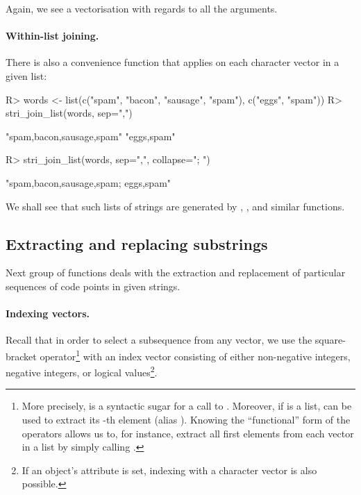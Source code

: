 \documentclass[nojss]{jss}\usepackage[]{graphicx}\usepackage[]{color}
\begin{document}
\noindent
Again, we see a vectorisation with regards to all the arguments.



\paragraph{Within-list joining.}
There is also a convenience function that applies 
on each character vector in a given list:

\begin{Schunk}
\begin{Sinput}
R> words <- list(c("spam", "bacon", "sausage", "spam"), c("eggs", "spam"))
R> stri_join_list(words, sep=",")
\end{Sinput}
\begin{Soutput}
[1] "spam,bacon,sausage,spam" "eggs,spam"
\end{Soutput}
\begin{Sinput}
R> stri_join_list(words, sep=",", collapse="; ")
\end{Sinput}
\begin{Soutput}
[1] "spam,bacon,sausage,spam; eggs,spam"
\end{Soutput}
\end{Schunk}

\noindent
We shall see that such lists of strings
are generated by , ,
and similar functions.





\subsection{Extracting and replacing substrings}

Next group of functions deals with the extraction and replacement
of particular sequences of code points in given strings.

\paragraph{Indexing vectors.}
Recall that in order to select a subsequence from any  vector,
we use the square-bracket operator\footnote{More precisely, 
is a syntactic sugar for a call to \code{`[`(x, i)}.
Moreover, if  is a list,  can be used to
extract its -th element (alias \code{`[[`(x, i)}).
Knowing the ``functional'' form of the operators allows us to, for instance,
extract all first elements from each vector in a list
by simply calling \code{sapply(x, "[[", 1)}.}
with an index vector consisting of either
non-negative integers, negative integers,
or logical values\footnote{If an object's  attribute is set,
indexing with a character vector is also possible.}.
\end{document}
